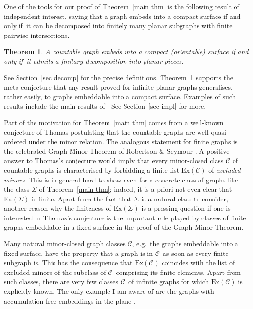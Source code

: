 \documentclass{article}
\newcommand{\ex}[1]{\mathrm{Ex}(#1)}
\newcommand{\defi}[1]{{\color{darkgray}\emph{#1}}}
\newtheorem{theorem}[proposition]{Theorem}
\newcommand{\cc}{\ensuremath{\mathcal C}}
\newcommand{\Tr}[1]{Theorem~\ref{#1}}
\newcommand{\Sr}[1]{Section~\ref{#1}}
\renewcommand{\iff}{if and only if}
\begin{document}
\medskip
One of the tools for our proof of \Tr{main thm} is the following result of independent interest, saying that a graph embeds into a compact surface \iff\ it can be decomposed into finitely many planar subgraphs with finite pairwise intersections. 
\begin{theorem}\label{thm decomp Intro}
A countable graph embeds into a compact (orientable) surface \iff\ it admits a finitary decomposition into planar pieces.
\end{theorem}
See \Sr{sec decomp} for the precise definitions. \Tr{thm decomp Intro} supports the meta-conjecture that any result proved for infinite planar graphs generalises, rather easily, to graphs embeddable into a compact surface. Examples of such results include the main results of \cite{intersection,planarPB,UKtrans,HuNaUni,kozPPP}. See \Sr{sec impl} for more.

\medskip
Part of the motivation for \Tr{main thm} comes from a well-known conjecture of Thomas \cite{ThoWel} postulating that the countable graphs are well-quasi-ordered under the minor relation. The analogous statement for finite graphs is the celebrated Graph Minor Theorem of Robertson \& Seymour \cite{GMXX}. A positive answer to Thomas's conjecture would imply that every minor-closed class $\cc$ of countable graphs is characterised by forbidding a finite list $\ex{\cc}$ of \defi{excluded minors}. This is in general hard to show even for a concrete class of graphs like the class $\Sigma$ of \Tr{main thm}; indeed, it is a-priori not even clear that $\ex{\Sigma}$ is finite. Apart from the fact that $\Sigma$ is a natural class to consider, another reason why the finiteness of $\ex{\Sigma}$ is a pressing question if one is interested in Thomas's conjecture is the important role played by classes of finite graphs embeddable in a fixed surface in the proof of the Graph Minor Theorem.

Many natural minor-closed graph classes  \cc, e.g.\ the graphs embeddable into a fixed surface, have the property that a graph is in \cc\ as soon as every finite subgraph is. This has the consequence that  $\ex{\cc}$ coincides with the list of excluded minors of the subclass of \cc\ comprising its finite elements. Apart from such classes, there are very few classes \cc\ of infinite graphs for which $\ex{\cc}$ is explicitly known. The only example I am aware of are the graphs with accumulation-free embeddings in the plane \cite{HalSom}. 
\end{document}
